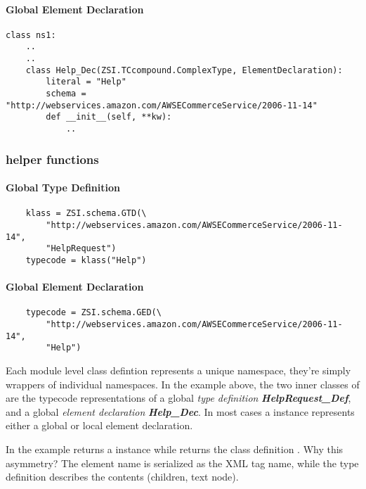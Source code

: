 \paragraph{Global Element Declaration}
\begin{verbatim}
class ns1:
    ..
    ..
    class Help_Dec(ZSI.TCcompound.ComplexType, ElementDeclaration):
        literal = "Help"
        schema = "http://webservices.amazon.com/AWSECommerceService/2006-11-14"
        def __init__(self, **kw):
            ..
\end{verbatim}
\par
\subsubsection{helper functions}
\paragraph{Global Type Definition}
\begin{verbatim}
    klass = ZSI.schema.GTD(\
        "http://webservices.amazon.com/AWSECommerceService/2006-11-14",
        "HelpRequest")
    typecode = klass("Help")
\end{verbatim}
\par
\paragraph{Global Element Declaration}
\begin{verbatim}
    typecode = ZSI.schema.GED(\
        "http://webservices.amazon.com/AWSECommerceService/2006-11-14",
        "Help")
\end{verbatim}
\par


Each module level class defintion represents a unique namespace, they're simply
wrappers of individual namespaces.  In the example above, the two inner classes
of \class{ns1} are the typecode representations of a global {\it type
definition} {\it \bfseries HelpRequest_Def}, and a global {\it element
declaration} {\it \bfseries Help_Dec}.  In most cases a 
instance represents either a global or local element declaration.

In the example \function{GED} returns a \class{Help_Dec} instance
while  returns the class definition .  Why
this asymmetry?
The element name is serialized as the XML tag name, while the type definition
describes the contents (children, text node).

